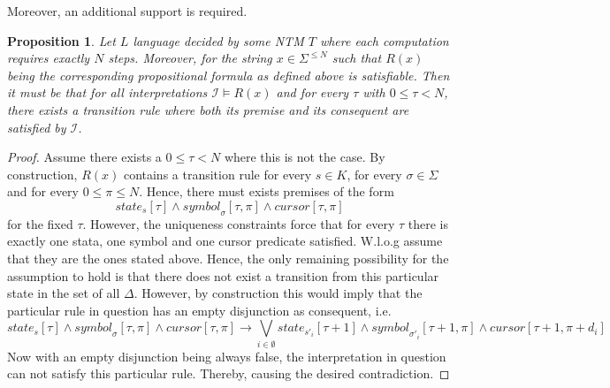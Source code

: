 \documentclass [11pt]{article}
\newtheorem{corollary}[theorem]{Corollary}
\newtheorem{proposition}[theorem]{Proposition}
\newcommand{\sym}[3]{\textit{symbol}_{#1}[#2,#3]}
\newcommand{\cursor}[2]{\textit{cursor}[#1,#2]}
\newcommand{\state}[2]{\textit{state}_{#1}[#2]}
\begin{document}
Moreover, an additional support is required.
\begin{proposition}
\label{prop:allways-trans}
Let $L$ language decided by some NTM $T$ where each computation requires exactly $N$ steps. Moreover, for the string $x \in \Sigma^{\leq N}$ such that $R(x)$  being the corresponding propositional formula as defined above is satisfiable.
Then it must be that for all interpretations $\mathcal{I} \models R(x)$ and for every $\tau$ with $0 \leq \tau < N$, there exists a transition rule where both its premise and its consequent are satisfied by $\mathcal{I}$.
\end{proposition}
\begin{proof}
Assume there exists a $0 \leq \tau< N$ where this is not the case. By construction, $R(x)$ contains a transition rule for every $s \in K$, for every $\sigma \in \Sigma$ and for every $0 \leq \pi \leq N$. Hence, there must exists premises of the form
\begin{equation*}
\state{s}{\tau} \wedge \sym{\sigma}{\tau}{\pi} \wedge \cursor{\tau}{\pi}
\end{equation*}
for the fixed $\tau$. However, the uniqueness constraints force that for every $\tau$ there is exactly one stata, one symbol and one cursor predicate satisfied. W.l.o.g assume that they are the ones stated above.
Hence, the only remaining possibility for the assumption to hold is that there does not exist a transition from this particular state 
in the set of all $\Delta$. However, by construction this would imply that the particular rule in question has an empty disjunction as consequent, i.e.
\begin{equation*}
\state{s}{\tau} \wedge \sym{\sigma}{\tau}{\pi} \wedge \cursor{\tau}{\pi} \to \bigvee_{i \in \emptyset}	\state{s'_i}{\tau+1} \wedge \sym{\sigma'_i}{\tau+1}{\pi} \wedge \cursor{\tau+1}{\pi+d_i}
\end{equation*}
Now with an empty disjunction being always false, the interpretation in question can not satisfy this particular rule. Thereby, causing the desired contradiction. 
\end{proof}


%
%
\end{document}
